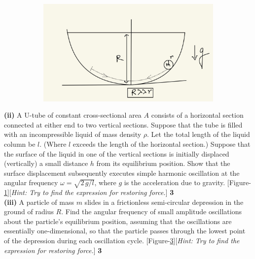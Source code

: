 \documentclass[12pt, a4paper]{article}
\begin{document}
{\begin{figure}[h]
\begin{subfigure}{.2\textwidth}
        \caption{}
        \label{fig:U-tube}
    \end{subfigure}
    \begin{subfigure}{.52\textwidth}
        \centering
        \includegraphics*[scale=0.16]{figs/semi-cir-depression.jpeg}
        \caption{}
        \label{fig:semi-circ-depression}
    \end{subfigure}
\end{figure}

\noindent
\textbf{(ii)} A U-tube of constant cross-sectional area $A$ consists of a horizontal section 
connected at either end to two vertical sections. Suppose that the tube is filled with an 
incompressible liquid of mass density $\rho$. Let the total length of the liquid column be $l$. 
(Where $l$ exceeds the length of the horizontal section.) Suppose that the surface of the liquid 
in one of the vertical sections is initially displaced (vertically) a small distance $h$ from its 
equilibrium position. Show that the surface displacement subsequently executes simple harmonic 
oscillation at the angular frequency $\omega=\sqrt{2\,g/l}$, where $g$ is the acceleration due to 
gravity. [Figure-\ref{fig:U-tube}][\textit{Hint: Try to find the expression for restoring force.}]
\hfill \textbf{3}\\

\noindent
\textbf{(iii)} A particle of mass $m$ slides in a frictionless semi-circular depression in the 
ground of radius $R$. Find the angular frequency of small amplitude oscillations about the 
particle's equilibrium position, assuming that the oscillations are essentially one-dimensional, 
so that the particle passes through the lowest point of the depression during each oscillation cycle.
[Figure-\ref{fig:semi-circ-depression}][\textit{Hint: Try to find the expression for restoring force.}]
\hfill \textbf{3}\\


}
\end{document}
